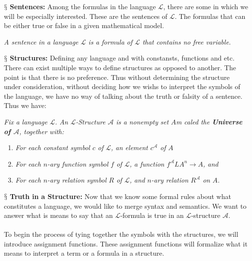 \documentclass[10pt,a4paper]{article}
\newcommand{\newpoint}[1]{\indent$\mathsection$ \textbf{#1}}
\newcommand{\curveL}{\mathcal{L}}
\newcommand{\curveA}{\mathcal{A}}
\begin{document}
                    \newpoint{Sentences:} Among the formulas in the language $\curveL$, there are some in which we will be especially interested. These are the sentences of $\curveL$. The formulas that can be either true or false in a given mathematical model.
                    \begin{define}
                        \textit{A sentence in a language $\curveL$ is a formula of $\curveL$ that contains no free variable.}
                    \end{define}
                    \newpoint{Structures: } Defining any language and with constansts, functions and etc. There can exist multiple ways to define structures as opposed to another. The point is that there is no preference. Thus without determining the structure under consideration, without deciding how we wishs to interpret the symbols of the language, we have no way of talking about the truth or falsity of a sentence. Thus we have:
                    \begin{define}
                        \textit{Fix a language $\curveL$. An $\curveL$-Structure $\curveA$ is a nonempty set $A$m caled the \textbf{Universe of $\curveA$}, together with:}
                        \begin{enumerate}
                            \item \textit{For each constant symbol $c$ of $\curveL$, an element $c^\curveA$ of $A$}
                            \item \textit{For each $n$-ary function symbol $f$ of $\curveL$, a function $f^\curveA L A^n\rightarrow A$, and }
                            \item \textit{For each $n$-ary relation symbol $R$ of $\curveL$, and $n$-ary relation $R^\curveA$ on $A$.}
                        \end{enumerate}
                    \end{define}
                    \newpoint{Truth in a Structure:} Now that we know some formal rules about what constitutes a language, we would like to merge syntax and semantics. We want to answer what is means to say that an $\curveL$-formula is true in an $\curveL$-structure $\curveA$.
                    \\
                    \\
                    To begin the process of tying together the symbols with the structures, we will introduce assignment functions. These assignment functions will formalize what it means to interpret a term or a formula in a structure.
\end{document}
